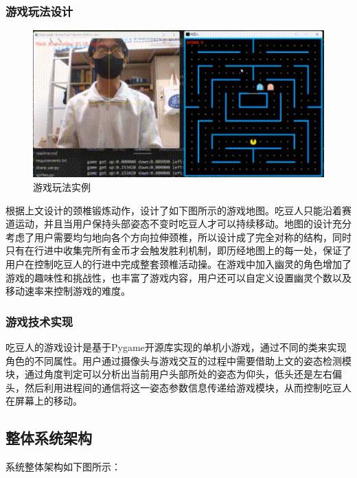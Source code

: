 \documentclass[12pt,a4paper]{article}%
\begin{document}
\subsubsection{游戏玩法设计}
\begin{figure}[H]
\centering
\includegraphics{./Part3-Design.pic/game.png}
\caption{游戏玩法实例}
\end{figure}

根据上文设计的颈椎锻炼动作，设计了如下图所示的游戏地图。吃豆人只能沿着赛道运动，并且当用户保持头部姿态不变时吃豆人才可以持续移动。地图的设计充分考虑了用户需要均匀地向各个方向拉伸颈椎，所以设计成了完全对称的结构，同时只有在行进中收集完所有金币才会触发胜利机制，即历经地图上的每一处，保证了用户在控制吃豆人的行进中完成整套颈椎活动操。在游戏中加入幽灵的角色增加了游戏的趣味性和挑战性，也丰富了游戏内容，用户还可以自定义设置幽灵个数以及移动速率来控制游戏的难度。

\subsubsection{游戏技术实现}
吃豆人的游戏设计是基于Pygame开源库实现的单机小游戏，通过不同的类来实现角色的不同属性。用户通过摄像头与游戏交互的过程中需要借助上文的姿态检测模块，通过角度判定可以分析出当前用户头部所处的姿态为仰头，低头还是左右偏头，然后利用进程间的通信将这一姿态参数信息传递给游戏模块，从而控制吃豆人在屏幕上的移动。


\subsection{整体系统架构}

系统整体架构如下图所示：
\end{document}

